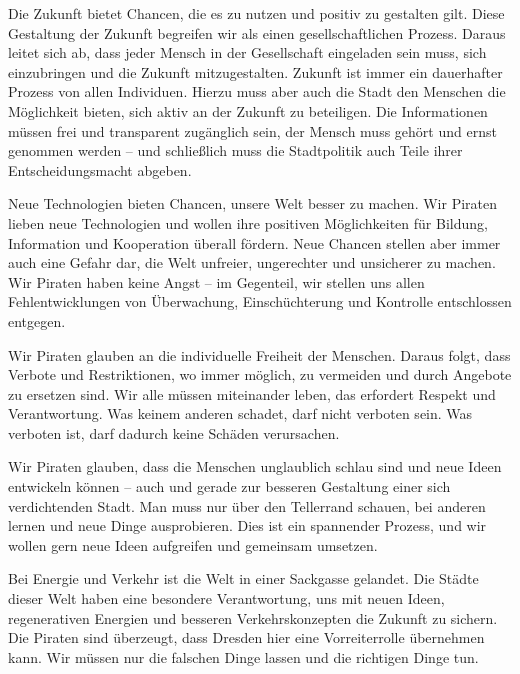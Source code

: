 \documentclass[a4paper, 11pt]{article}
\begin{document}
Die Zukunft bietet Chancen, die es zu nutzen und positiv zu gestalten gilt. Diese Gestaltung der Zukunft begreifen wir als einen gesellschaftlichen Prozess. Daraus leitet sich ab, dass jeder Mensch in der Gesellschaft eingeladen sein muss, sich einzubringen und die Zukunft mitzugestalten. Zukunft ist immer ein dauerhafter Prozess von allen Individuen. Hierzu muss aber auch die Stadt den Menschen die Möglichkeit bieten, sich aktiv an der Zukunft zu beteiligen. Die Informationen müssen frei und transparent zugänglich sein, der Mensch muss gehört und ernst genommen werden – und schließlich muss die Stadtpolitik auch Teile ihrer Entscheidungsmacht abgeben.\newline
\vspace*{0.25cm}

Neue Technologien bieten Chancen, unsere Welt besser zu machen. Wir Piraten lieben neue Technologien und wollen ihre positiven Möglichkeiten für Bildung, Information und Kooperation überall fördern. Neue Chancen stellen aber immer auch eine Gefahr dar, die Welt unfreier, ungerechter und unsicherer zu machen. Wir Piraten haben keine Angst – im Gegenteil, wir stellen uns allen Fehlentwicklungen von Überwachung, Einschüchterung und Kontrolle entschlossen entgegen.\newline
\vspace*{0.25cm}

Wir Piraten glauben an die individuelle Freiheit der Menschen. Daraus folgt, dass Verbote und Restriktionen, wo immer möglich, zu vermeiden und durch Angebote zu ersetzen sind. Wir alle müssen miteinander leben, das erfordert Respekt und Verantwortung. Was keinem anderen schadet, darf nicht verboten sein. Was verboten ist, darf dadurch keine Schäden verursachen.\newline
\vspace*{0.25cm}

Wir Piraten glauben, dass die Menschen unglaublich schlau sind und neue Ideen entwickeln können – auch und gerade zur besseren Gestaltung einer sich verdichtenden Stadt. Man muss nur über den Tellerrand schauen, bei anderen lernen und neue Dinge ausprobieren. Dies ist ein spannender Prozess, und wir wollen gern neue Ideen aufgreifen und gemeinsam umsetzen.\newline
\newpage

Bei Energie und Verkehr ist die Welt in einer Sackgasse gelandet. Die Städte dieser Welt haben eine besondere Verantwortung, uns mit neuen Ideen, regenerativen Energien und besseren Verkehrskonzepten die Zukunft zu sichern. Die Piraten sind überzeugt, dass Dresden hier eine Vorreiterrolle übernehmen kann. Wir müssen nur die falschen Dinge lassen und die richtigen Dinge tun.\newline
\end{document}
